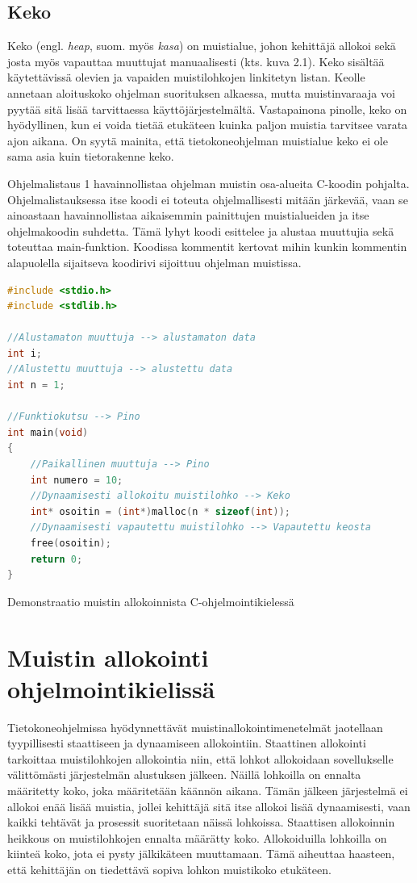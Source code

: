 \subsection{Keko}

Keko (engl. \textit{heap}, suom. myös \textit{kasa}) on muistialue, johon kehittäjä allokoi sekä josta myös vapauttaa muuttujat manuaalisesti (kts. kuva 2.1). Keko sisältää käytettävissä olevien ja vapaiden muistilohkojen linkitetyn listan. Keolle annetaan aloituskoko ohjelman suorituksen alkaessa, mutta muistinvaraaja voi pyytää sitä lisää tarvittaessa käyttöjärjestelmältä. Vastapainona pinolle, keko on hyödyllinen, kun ei voida tietää etukäteen kuinka paljon muistia tarvitsee varata ajon aikana.\cite{mmic2010} On syytä mainita, että tietokoneohjelman muistialue keko ei ole sama asia kuin tietorakenne keko.

Ohjelmalistaus 1 havainnollistaa ohjelman muistin osa-alueita C-koodin pohjalta. Ohjelmalistauksessa itse koodi ei toteuta ohjelmallisesti mitään järkevää, vaan se ainoastaan havainnollistaa aikaisemmin painittujen muistialueiden ja itse ohjelmakoodin suhdetta. Tämä lyhyt koodi esittelee ja alustaa muuttujia sekä toteuttaa main-funktion. Koodissa kommentit kertovat mihin kunkin kommentin alapuolella sijaitseva koodirivi sijoittuu ohjelman muistissa.

\begin{algorithm}[tbh]
\begin{lstlisting}[language=C]
#include <stdio.h>
#include <stdlib.h>

//Alustamaton muuttuja --> alustamaton data
int i;
//Alustettu muuttuja --> alustettu data 
int n = 1; 

//Funktiokutsu --> Pino
int main(void)  
{  
    //Paikallinen muuttuja --> Pino
    int numero = 10;
    //Dynaamisesti allokoitu muistilohko --> Keko    
    int* osoitin = (int*)malloc(n * sizeof(int));
    //Dynaamisesti vapautettu muistilohko --> Vapautettu keosta  
    free(osoitin);
    return 0;
}
\end{lstlisting}
\caption{Demonstraatio muistin allokoinnista C-ohjelmointikielessä\label{alg:Demonstraatio}}
\end{algorithm}

\section{Muistin allokointi ohjelmointikielissä}

Tietokoneohjelmissa hyödynnettävät muistinallokointimenetelmät jaotellaan tyypillisesti staattiseen ja dynaamiseen allokointiin. Staattinen allokointi tarkoittaa muistilohkojen allokointia niin, että lohkot allokoidaan sovellukselle välittömästi järjestelmän alustuksen jälkeen. Näillä lohkoilla on ennalta määritetty koko, joka määritetään käännön aikana. Tämän jälkeen järjestelmä ei allokoi enää lisää muistia, jollei kehittäjä sitä itse allokoi lisää dynaamisesti, vaan kaikki tehtävät ja prosessit suoritetaan näissä lohkoissa. Staattisen allokoinnin heikkous on muistilohkojen ennalta määrätty koko. Allokoiduilla lohkoilla on kiinteä koko, jota ei pysty jälkikäteen muuttamaan. Tämä aiheuttaa haasteen, että kehittäjän on tiedettävä sopiva lohkon muistikoko etukäteen.\cite{daroemmfera@2006}

